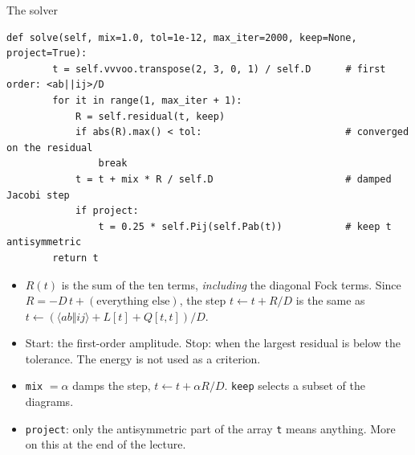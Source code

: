 \documentclass[aspectratio=169,10pt]{beamer}
\newcommand{\as}[4]{\langle #1#2\Vert #3#4\rangle}
\begin{document}
\begin{frame}[fragile,shrink=6]{The solver}
\begin{lstlisting}[style=big]
    def solve(self, mix=1.0, tol=1e-12, max_iter=2000, keep=None, project=True):
        t = self.vvvoo.transpose(2, 3, 0, 1) / self.D      # first order: <ab||ij>/D
        for it in range(1, max_iter + 1):
            R = self.residual(t, keep)
            if abs(R).max() < tol:                         # converged on the residual
                break
            t = t + mix * R / self.D                       # damped Jacobi step
            if project:
                t = 0.25 * self.Pij(self.Pab(t))           # keep t antisymmetric
        return t
\end{lstlisting}
\begin{itemize}
\item $R(t)$ is the sum of the ten terms, \emph{including} the diagonal Fock terms. Since $R=-D\,t+(\text{everything else})$, the step $t\leftarrow t+R/D$ is the same as $t\leftarrow(\as abij+L[t]+Q[t,t])/D$.
\item Start: the first-order amplitude. Stop: when the largest residual is below the tolerance. The energy is not used as a criterion.
\item \texttt{mix} $=\alpha$ damps the step, $t\leftarrow t+\alpha R/D$. \texttt{keep} selects a subset of the diagrams.
\item \texttt{project}: only the antisymmetric part of the array \texttt{t} means anything. More on this at the end of the lecture.
\end{itemize}
\end{frame}
\end{document}
